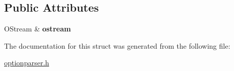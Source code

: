 \subsection*{Public Attributes}
\begin{DoxyCompactItemize}
\item 
\mbox{\label{structoption_1_1PrintUsageImplementation_1_1OStreamWriter_a9b808696e204a834acd4362c62b9f4c1}} 
O\+Stream \& {\bfseries ostream}
\end{DoxyCompactItemize}


The documentation for this struct was generated from the following file\+:\begin{DoxyCompactItemize}
\item 
\hyperlink{optionparser_8h}{optionparser.\+h}\end{DoxyCompactItemize}
